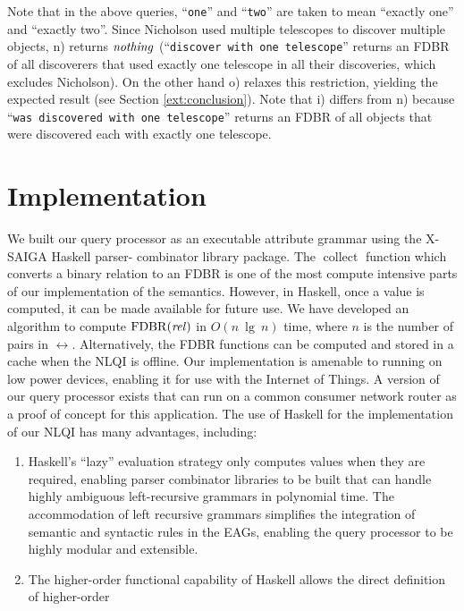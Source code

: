 \documentclass[../main.tex]{subfiles}
\begin{document}
\begin{refsection}
Note that in the above queries, ``\texttt{one}'' and ``\texttt{two}'' are taken to mean ``exactly one'' and ``exactly two''. Since Nicholson used multiple telescopes to discover multiple objects, n) returns $\operatorname{\mathit{nothing}}$ (``\texttt{discover with one telescope}'' returns an FDBR of all discoverers that used exactly one telescope in all their discoveries, which excludes Nicholson). On the other hand o) relaxes this restriction, yielding the expected result (see Section \ref{ext:conclusion}).  Note that i) differs from n) because ``\texttt{was discovered with one telescope}'' returns an FDBR of all objects that were discovered each with exactly one telescope.

\section{Implementation}
\label{ext:implementation}
We built our query processor as an executable attribute grammar using the X-SAIGA Haskell parser-
combinator library package. %
The $\operatorname{collect}$ function which converts a binary relation to an FDBR is one of the most
compute intensive parts of our implementation of the semantics. However, in Haskell, once a value is
computed, it can be made available for future use. We have developed an algorithm to compute
$\operatorname{FDBR}({\operatorname{\mathit{rel}}})$ in $O(n\ \operatorname{lg}\ n)$ time, where $n$ is the number of pairs in $\rel$.
Alternatively, the FDBR functions can be computed and stored in a cache when the NLQI is offline.
Our implementation is amenable to running on low power devices, enabling it for use with the Internet of Things. A version of our query processor exists that can run on a common consumer network router as a proof of concept for this application.
The use of Haskell for the implementation of our NLQI has many advantages, including:
\begin{enumerate}
	\setlength\itemsep{0em}
	\item Haskell's ``lazy'' evaluation strategy only computes values when they are required, enabling parser combinator
	libraries to be built that can handle highly ambiguous left-recursive grammars in polynomial time. The accommodation of left recursive
	grammars simplifies the integration of semantic and syntactic rules in the EAGs, enabling the query processor to be highly modular and extensible.
	\item The higher-order functional capability of Haskell allows the direct definition of higher-order

\end{enumerate}
\end{refsection}
\end{document}
